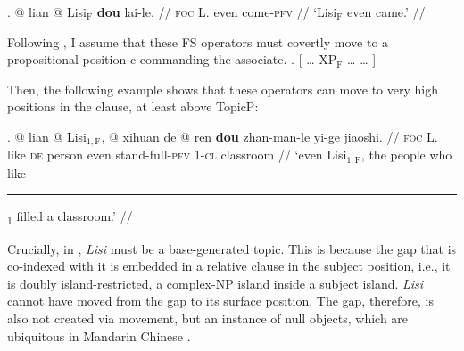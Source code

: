 \documentclass[11pt]{article}
\let\latextextsubscript\textsubscript
\let\textsubscript\latextextsubscript
\newcommand{\gap}[1]{\rule{1em}{0.4pt}\textsubscript{#1}}
\newcommand{\F}{\ensuremath{_{\mathrm{F}}}}
\begin{document}
\ex. \begingl
\gla \nogloss{(} @ lian @ \nogloss{)} Lisi\F{} \textbf{dou} lai-le. //
  \glb \textsc{foc} L. even come-\textsc{pfv} //
  \glft `Lisi\F{} even came.' //
\endgl

Following \citep{liuVarietiesAlternativesMandarin2017,liuPragmaticExplanationMeidou2021,crnicNonmonotonicityNPILicensing2014}, I assume that these FS operators must covertly move to a propositional position c-commanding the associate.
\ex.  [ \ldots{} XP\F{} \ldots{} \tikzmarknode{base}{\gap{}} \ldots{} ]

Then, the following example shows that these operators can move to very high positions in the clause, at least above TopicP:

\ex. \label{ex:double_island}\begingl
\gla \nogloss{(} @ lian @ \nogloss{)} Lisi\(_{1, \mathrm{F}}\), \nogloss{\I{[}RC {} } @ xihuan \nogloss{\gap{1}} de @ \nogloss{]} ren \textbf{dou} zhan-man-le yi-ge jiaoshi. //
  \glb \textsc{foc} L. like \textsc{de} person even stand-full-\textsc{pfv} 1-\textsc{cl} classroom //
  \glft `even Lisi\(_{1, \mathrm{F}}\), the people who like \gap{1} filled a classroom.' //
\endgl



Crucially, in \Last, \emph{Lisi} must be a base-generated topic.
This is because the gap that is co-indexed with it is embedded in a relative clause in the subject position, i.e., it is doubly island-restricted, a complex-NP island inside a subject island.
\emph{Lisi} cannot have moved from the gap to its surface position.
The gap, therefore, is also not created via movement, but an instance of null objects, which are ubiquitous in Mandarin Chinese \citep{liBornEmpty2014}.
\end{document}
